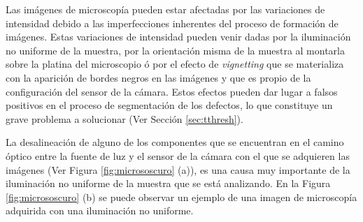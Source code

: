 Las imágenes de microscopía pueden estar afectadas por las variaciones de intensidad debido a las imperfecciones inherentes del proceso de formación de imágenes. Estas variaciones de intensidad pueden venir dadas por la iluminación no uniforme de la muestra, por la orientación misma de la muestra al montarla sobre la platina del microscopio ó por el efecto de \textit{vignetting} que se materializa con la aparición de bordes negros en las imágenes y que es propio de la configuración del sensor de la cámara. Estos efectos pueden dar lugar a falsos positivos en el proceso de segmentación de los defectos, lo que constituye un grave problema a solucionar (Ver Sección \ref{sec:tthresh}).

La desalineación de alguno de los componentes que se encuentran en el camino óptico entre la fuente de luz y el sensor de la cámara con el que se adquieren las imágenes (Ver Figura \ref{fig:micrososcuro} (a)), es una causa muy importante de la iluminación no uniforme de la muestra que se está analizando. En la Figura \ref{fig:micrososcuro} (b) se puede observar un ejemplo de una imagen de microscopía adquirida con una iluminación no uniforme.
